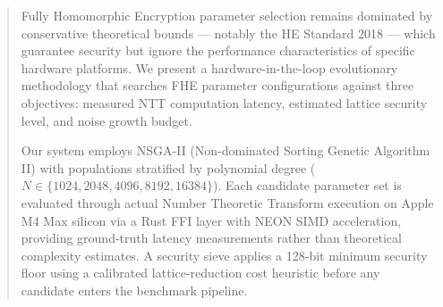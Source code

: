 \begin{abstract}

Fully Homomorphic Encryption parameter selection remains dominated by conservative theoretical bounds --- notably the HE Standard 2018 --- which guarantee security but ignore the performance characteristics of specific hardware platforms. We present a hardware-in-the-loop evolutionary methodology that searches FHE parameter configurations against three objectives: measured NTT computation latency, estimated lattice security level, and noise growth budget.

Our system employs NSGA-II (Non-dominated Sorting Genetic Algorithm II) with populations stratified by polynomial degree (\(N \in \{1024, 2048, 4096, 8192, 16384\}\)). Each candidate parameter set is evaluated through actual Number Theoretic Transform execution on Apple M4 Max silicon via a Rust FFI layer with NEON SIMD acceleration, providing ground-truth latency measurements rather than theoretical complexity estimates. A security sieve applies a 128-bit minimum security floor using a calibrated lattice-reduction cost heuristic before any candidate enters the benchmark pipeline.


\end{abstract}
